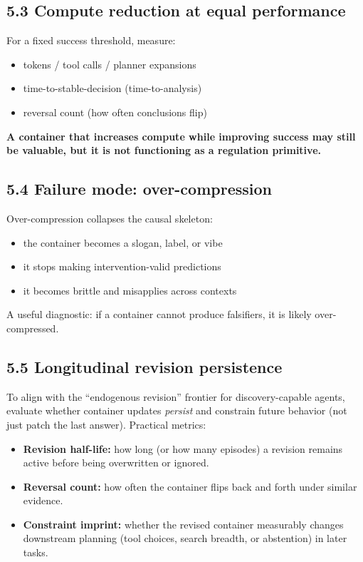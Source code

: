 \documentclass[11pt]{article}
\begin{document}
\subsection*{5.3 Compute reduction at equal performance}
For a fixed success threshold, measure:

\begin{itemize}
\item tokens / tool calls / planner expansions
\item time-to-stable-decision (time-to-analysis)
\item reversal count (how often conclusions flip)
\end{itemize}

\textbf{A container that increases compute while improving success may still be valuable, but it is not functioning as a regulation primitive.}

\subsection*{5.4 Failure mode: over-compression}
Over-compression collapses the causal skeleton:

\begin{itemize}
\item the container becomes a slogan, label, or vibe
\item it stops making intervention-valid predictions
\item it becomes brittle and misapplies across contexts
\end{itemize}

A useful diagnostic: if a container cannot produce falsifiers, it is likely over-compressed.\subsection*{5.5 Longitudinal revision persistence}
To align with the ``endogenous revision'' frontier for discovery-capable agents, evaluate whether container updates \emph{persist} and constrain future behavior (not just patch the last answer). Practical metrics:
\begin{itemize}
\item \textbf{Revision half-life:} how long (or how many episodes) a revision remains active before being overwritten or ignored.
\item \textbf{Reversal count:} how often the container flips back and forth under similar evidence.
\item \textbf{Constraint imprint:} whether the revised container measurably changes downstream planning (tool choices, search breadth, or abstention) in later tasks.
\end{itemize}
\end{document}
